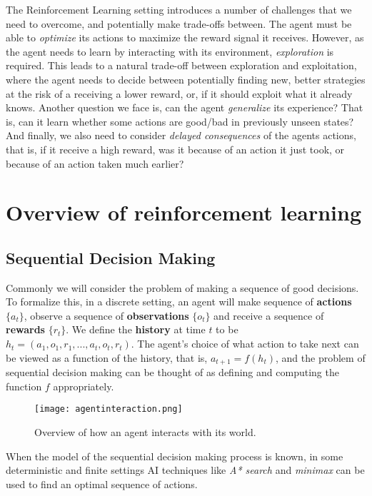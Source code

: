 \documentclass{article}
\begin{document}
The Reinforcement Learning setting introduces a number of challenges that we need to overcome, and potentially make trade-offs between. The agent must be able to \textit{optimize} its actions to maximize the reward signal it receives. However, as the agent needs to learn by interacting with its environment, \textit{exploration} is required. This leads to a natural trade-off between exploration and exploitation, where the agent needs to decide between potentially finding new, better strategies at the risk of a receiving a lower reward, or, if it should exploit what it already knows. Another question we face is, can the agent \textit{generalize} its experience? That is, can it learn whether some actions are good/bad in previously unseen states? And finally, we also need to consider \textit{delayed consequences} of the agents actions, that is, if it receive a high reward, was it because of an action it just took, or because of an action taken much earlier?



\section{Overview of reinforcement learning}
\subsection{Sequential Decision Making} \label{seq:sequentialDecisionMaking}

Commonly we will consider the problem of making a sequence of good decisions. To formalize this, in a discrete setting, an agent will make sequence of \textbf{actions} $\{a_t\}$, observe a sequence of \textbf{observations} $\{o_t\}$ and receive a sequence of \textbf{rewards} $\{r_t\}$. We define the \textbf{history} at time $t$ to be $h_t=(a_1, o_1, r_1, ..., a_t, o_t, r_t)$. The agent’s choice of what action to take next can be viewed as a function of the history, that is, $a_{t+1} = f(h_t)$, and the problem of sequential decision making can be thought of as defining and computing the function $f$ appropriately. 

\begin{figure}[H]
	\centering
    \texttt{[image: agentinteraction.png]}
    \caption{Overview of how an agent interacts with its world.}
\end{figure}

When the model of the sequential decision making process is known, in some deterministic and finite settings AI techniques like \textit{A* search} and \textit{minimax} can be used to find an optimal sequence of actions.
\end{document}
